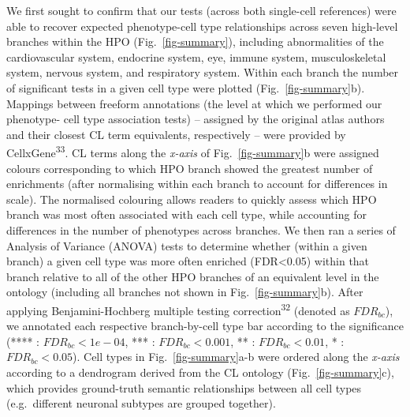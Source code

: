 \documentclass[
]{article}
\begin{document}
We first sought to confirm that our tests (across both single-cell
references) were able to recover expected phenotype-cell type
relationships across seven high-level branches within the HPO
(Fig.~\ref{fig-summary}), including abnormalities of the cardiovascular
system, endocrine system, eye, immune system, musculoskeletal system,
nervous system, and respiratory system. Within each branch the number of
significant tests in a given cell type were plotted
(Fig.~\ref{fig-summary}b). Mappings between freeform annotations (the
level at which we performed our phenotype- cell type association tests)
-- assigned by the original atlas authors and their closest CL term
equivalents, respectively -- were provided by
CellxGene\textsuperscript{33}. CL terms along the \emph{x-axis} of
Fig.~\ref{fig-summary}b were assigned colours corresponding to which HPO
branch showed the greatest number of enrichments (after normalising
within each branch to account for differences in scale). The normalised
colouring allows readers to quickly assess which HPO branch was most
often associated with each cell type, while accounting for differences
in the number of phenotypes across branches. We then ran a series of
Analysis of Variance (ANOVA) tests to determine whether (within a given
branch) a given cell type was more often enriched (FDR\textless0.05)
within that branch relative to all of the other HPO branches of an
equivalent level in the ontology (including all branches not shown in
Fig.~\ref{fig-summary}b). After applying Benjamini-Hochberg multiple
testing correction\textsuperscript{32} (denoted as \(FDR _{bc}\)), we
annotated each respective branch-by-cell type bar according to the
significance (**** : \(FDR _{bc}<1e-04\), *** : \(FDR _{bc}<0.001\), **
: \(FDR _{bc}<0.01\), * : \(FDR _{bc}<0.05\)). Cell types in
Fig.~\ref{fig-summary}a-b were ordered along the \emph{x-axis} according
to a dendrogram derived from the CL ontology (Fig.~\ref{fig-summary}c),
which provides ground-truth semantic relationships between all cell
types (e.g.~different neuronal subtypes are grouped together).
\end{document}

